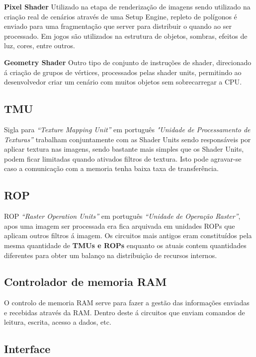 \documentclass{report}
\begin{document}
\textbf{Pixel Shader} Utilizado na etapa de renderização de imagens sendo utilizado na criação real de cenários através de uma Setup Engine, repleto de polígonos é enviado para uma fragmentação que server para distribuir o quando ao ser processado. Em jogos são utilizados na estrutura de objetos, sombras, efeitos de luz, cores, entre outros.

\textbf{Geometry Shader} Outro tipo de conjunto de instruções de shader, direcionado á criação de grupos de vértices, processados pelas shader units, permitindo ao desenvolvedor criar um cenário com muitos objetos sem sobrecarregar a \ac{CPU}.

\subsection{TMU}
\label{sect.TMU}

Sigla para \textit{“Texture Mapping Unit”} em português \textit{"Unidade de Processamento de Texturas”} trabalham conjuntamente com as Shader Units sendo responsáveis por aplicar textura nas imagens, sendo bastante mais simples que os Shader Units, podem ficar limitadas quando ativados filtros de textura. Isto pode agravar-se caso a comunicação com a memoria tenha baixa taxa de transferência.

\subsection{ROP}
\label{sect.ROP}

ROP \textit{“Raster Operation Units”} em português \textit{“Unidade de Operação Raster”}, apos uma imagem ser processada era fica arquivada em unidades ROPs que aplicam outros filtros á imagem. Os circuitos mais antigos eram constituídos pela mesma quantidade de \textbf{TMUs e ROPs} enquanto os atuais contem quantidades diferentes para obter um balanço na distribuição de recursos internos.  

\subsection{Controlador de memoria RAM}
\label{sect.Controlador de memoria RAM}

O controlo de memoria RAM serve para fazer a gestão das informações enviadas e recebidas através da RAM. Dentro deste á circuitos que enviam comandos de leitura, escrita, acesso a dados, etc.

\subsection{Interface}
\label{sect.Interface}
\end{document}
